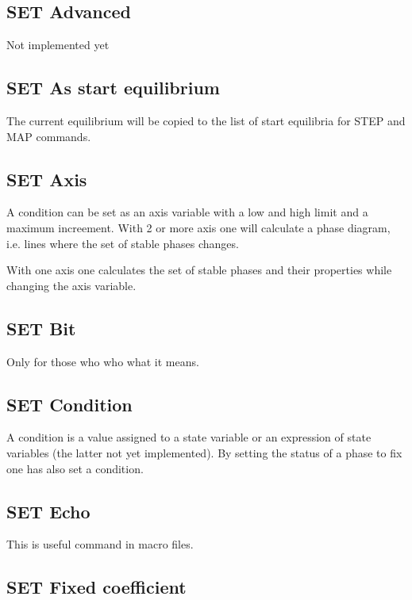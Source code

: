 \documentclass[12pt]{article}
\begin{document}
\subsection{SET Advanced}

Not implemented yet

\subsection{SET As start equilibrium}

The current equilibrium will be copied to the list of start equilibria
for STEP and MAP commands.

\subsection{SET Axis}

A condition can be set as an axis variable with a low and high limit
and a maximum increement.  With 2 or more axis one will calculate a
phase diagram, i.e. lines where the set of stable phases changes.

With one axis one calculates the set of stable phases and their
properties while changing the axis variable.

\subsection{SET Bit}

Only for those who who what it means.

\subsection{SET Condition}

A condition is a value assigned to a state variable or an expression
of state variables (the latter not yet implemented).  By setting the
status of a phase to fix one has also set a condition.

\subsection{SET Echo}

This is useful command in macro files.

\subsection{SET Fixed coefficient}
\end{document}
